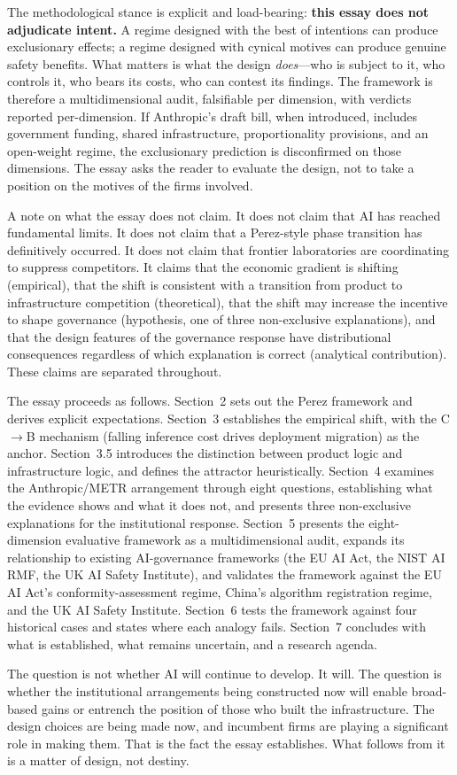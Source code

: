 The methodological stance is explicit and load-bearing: \textbf{this essay does not adjudicate intent.} A regime designed with the best of intentions can produce exclusionary effects; a regime designed with cynical motives can produce genuine safety benefits. What matters is what the design \emph{does}---who is subject to it, who controls it, who bears its costs, who can contest its findings. The framework is therefore a multidimensional audit, falsifiable per dimension, with verdicts reported per-dimension. If Anthropic's draft bill, when introduced, includes government funding, shared infrastructure, proportionality provisions, and an open-weight regime, the exclusionary prediction is disconfirmed on those dimensions. The essay asks the reader to evaluate the design, not to take a position on the motives of the firms involved.

A note on what the essay does not claim. It does not claim that AI has reached fundamental limits. It does not claim that a Perez-style phase transition has definitively occurred. It does not claim that frontier laboratories are coordinating to suppress competitors. It claims that the economic gradient is shifting (empirical), that the shift is consistent with a transition from product to infrastructure competition (theoretical), that the shift may increase the incentive to shape governance (hypothesis, one of three non-exclusive explanations), and that the design features of the governance response have distributional consequences regardless of which explanation is correct (analytical contribution). These claims are separated throughout.

The essay proceeds as follows. Section~2 sets out the Perez framework and derives explicit expectations. Section~3 establishes the empirical shift, with the C$\rightarrow$B mechanism (falling inference cost drives deployment migration) as the anchor. Section~3.5 introduces the distinction between product logic and infrastructure logic, and defines the attractor heuristically. Section~4 examines the Anthropic/METR arrangement through eight questions, establishing what the evidence shows and what it does not, and presents three non-exclusive explanations for the institutional response. Section~5 presents the eight-dimension evaluative framework as a multidimensional audit, expands its relationship to existing AI-governance frameworks (the EU AI Act, the NIST AI RMF, the UK AI Safety Institute), and validates the framework against the EU AI Act's conformity-assessment regime, China's algorithm registration regime, and the UK AI Safety Institute. Section~6 tests the framework against four historical cases and states where each analogy fails. Section~7 concludes with what is established, what remains uncertain, and a research agenda.

The question is not whether AI will continue to develop. It will. The question is whether the institutional arrangements being constructed now will enable broad-based gains or entrench the position of those who built the infrastructure. The design choices are being made now, and incumbent firms are playing a significant role in making them. That is the fact the essay establishes. What follows from it is a matter of design, not destiny.
